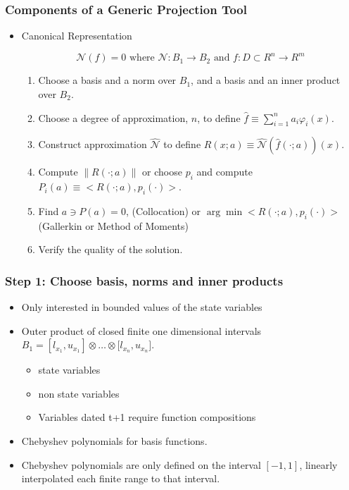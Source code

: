 \documentclass[tikz]{beamer}
\begin{document}
\begin{frame}
  \frametitle{Components of a Generic Projection Tool}
{\small

  \begin{itemize}
  \item Canonical Representation\cite{judd98}\


\begin{equation*}
  \mathcal{N}(f)=0\text{ where }\mathcal{N}:B_{1}\rightarrow B_{2}\text{ and }%
  f:D\subset R^{n}\rightarrow R^{m}
\end{equation*}%


\begin{enumerate}
\item Choose a basis and a norm over $B_{1}$, and a basis and an inner
  product over $B_{2}.$

\item Choose a degree of approximation, $n$, to define $\hat{f}\equiv
  \sum_{i=1}^{n}a_{i}\varphi _{i}(x).$

\item Construct approximation $\hat{\mathcal{N}}$ to define
  $R(x;a)\equiv \hat{\mathcal{N}}(\hat{f}(\cdot ;a))(x).$

\item Compute $\parallel R(\cdot ;a)\parallel $ or choose $p_{i}$ and
  compute $P_{i}(a)\equiv <R(\cdot ;a),p_{i}(\cdot )>$.

\item Find $a\ni P(a)=0 $, (Collocation) or $\arg\min <R(\cdot
  ;a),p_{i}(\cdot )>$ (Gallerkin or Method of Moments)


\item Verify the quality of the solution.
\end{enumerate}
\end{itemize}
}
\end{frame}
\begin{frame}

\frametitle{Step 1: Choose basis, norms and inner products }

\begin{itemize}
\item Only interested in bounded values of the state variables
\item Outer product of closed finite one dimensional intervals
  $B_{1}=[l_{x_{1}},u_{x_{1}}]\otimes \ldots \otimes \lbrack
  l_{x_{n}},u_{x_{n}}]$.
  \begin{itemize}
  \item state variables
  \item  non state variables
  \item Variables dated t+1 require function compositions
  \end{itemize}
\item Chebyshev polynomials for basis functions.
\item Chebyshev polynomials are only defined on the interval $[-1,1]$,
  linearly interpolated each finite range to that interval.
\end{itemize}

\end{frame}
\end{document}
